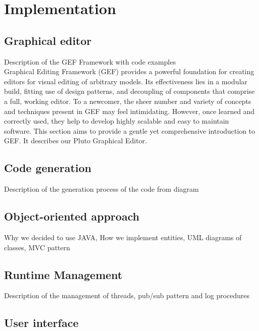 \chapter{Implementation}
\label{cap5}



\section{Graphical editor}\label{editor}

Description of the GEF Framework with code examples
\\
Graphical Editing Framework (GEF) provides a powerful foundation for creating editors for visual editing of arbitrary models. Its effectiveness lies in a modular build, fitting use of design patterns, and decoupling of components that comprise a full, working editor. To a newcomer, the sheer number and variety of concepts and techniques present in GEF may feel intimidating. However, once learned and correctly used, they help to develop highly scalable and easy to maintain software. This section aims to provide a gentle yet comprehensive introduction to GEF. It describes our Pluto Graphical Editor.


\section{Code generation}\label{codeGeneration}

Description of the generation process of the code from diagram

\section{Object-oriented approach}\label{oomodel}

Why we decided to use JAVA, How we implement entities, UML diagrams of classes, MVC pattern

\section{Runtime Management}\label{runtimeMng}

Description of the management of threads, pub/sub pattern and log procedures

\section{User interface}\label{interface}

